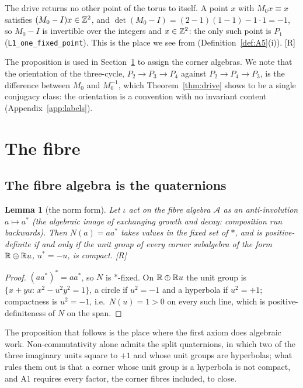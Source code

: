 \documentclass[11pt,a4paper]{article}
\theoremstyle{plain}
\newtheorem{lemma}[theorem]{Lemma}
\theoremstyle{definition}
\theoremstyle{remark}
\newcommand{\rigR}{[\textup{R}]}
\begin{document}
The drive returns no other point of the torus to itself. A point $x$ with $M_{0}x\equiv x$ satisfies $(M_{0}-I)x\in\mathbb{Z}^{2}$, and $\det(M_{0}-I)=(2-1)(1-1)-1\cdot1=-1$, so $M_{0}-I$ is invertible over the integers and $x\in\mathbb{Z}^{2}$: the only such point is $P_{1}$ (\texttt{L1\_one\_fixed\_point}). This is the place we see from (Definition~\ref{def:A5}(i)). \rigR

The proposition is used in Section~\ref{sec:fibre} to assign the corner algebras. We note that the orientation of the three-cycle, $P_{2}\to P_{3}\to P_{4}$ against $P_{2}\to P_{4}\to P_{3}$, is the difference between $M_{0}$ and $M_{0}^{-1}$, which Theorem~\ref{thm:drive} shows to be a single conjugacy class: the orientation is a convention with no invariant content (Appendix~\ref{app:labels}).

\section{The fibre}\label{sec:fibre}

\subsection{The fibre algebra is the quaternions}

\begin{lemma}[the norm form]\label{lem:norm}
Let $\iota$ act on the fibre algebra $\mathcal{A}$ as an anti-involution $a\mapsto a^{*}$ (the algebraic image of exchanging growth and decay: composition run backwards). Then $N(a)=aa^{*}$ takes values in the fixed set of $*$, and is positive-definite if and only if the unit group of every corner subalgebra of the form $\mathbb{R}\oplus\mathbb{R} u$, $u^{*}=-u$, is compact. \rigR
\end{lemma}

\begin{proof}
$(aa^{*})^{*}=aa^{*}$, so $N$ is $*$-fixed. On $\mathbb{R}\oplus\mathbb{R} u$ the unit group is $\{x+yu:\,x^{2}-u^{2}y^{2}=1\}$, a circle if $u^{2}=-1$ and a hyperbola if $u^{2}=+1$; compactness is $u^{2}=-1$, i.e.\ $N(u)=1>0$ on every such line, which is positive-definiteness of $N$ on the span.
\end{proof}

The proposition that follows is the place where the first axiom does algebraic work. Non-commutativity alone admits the split quaternions, in which two of the three imaginary units square to $+1$ and whose unit groups are hyperbolas; what rules them out is that a corner whose unit group is a hyperbola is not compact, and A1 requires every factor, the corner fibres included, to close.
\end{document}
